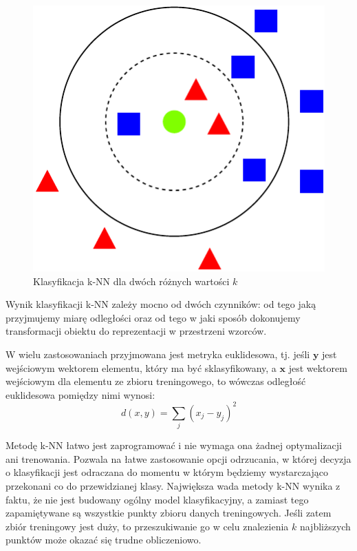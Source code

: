 \begin{figure}[h]
	\centering
	\includegraphics[scale=1.0]{graphics/01_podstawy_teoretyczne/knn-example.pdf}
	\caption{ Klasyfikacja k-NN dla dwóch różnych wartości $k$ \cite{AJANKI07} }
	\label{fig:knn-example}
\end{figure}

Wynik klasyfikacji k-NN zależy mocno od dwóch czynników: od tego jaką przyjmujemy miarę odległości oraz od tego w jaki sposób dokonujemy transformacji obiektu do reprezentacji w przestrzeni wzorców.

W wielu zastosowaniach przyjmowana jest metryka euklidesowa, tj. jeśli $\boldsymbol{y}$ jest wejściowym wektorem elementu, który ma być sklasyfikowany, a $\boldsymbol{x}$ jest wektorem wejściowym dla elementu ze zbioru treningowego, to wówczas odległość euklidesowa pomiędzy nimi wynosi:
\begin{equation} 
\label{knn-euclides} 
d(x, y) = \sum_j (x_j - y_j)^2
\end{equation}

Metodę k-NN łatwo jest zaprogramować i nie wymaga ona żadnej optymalizacji ani trenowania. Pozwala na łatwe zastosowanie opcji odrzucania, w której decyzja o klasyfikacji jest odraczana do momentu w którym będziemy wystarczająco przekonani co do przewidzianej klasy. Największa wada metody k-NN wynika z faktu, że nie jest budowany ogólny model klasyfikacyjny, a zamiast tego zapamiętywane są wszystkie punkty zbioru danych treningowych. Jeśli zatem zbiór treningowy jest duży, to przeszukiwanie go w celu znalezienia $k$ najbliższych punktów może okazać się trudne obliczeniowo.\cite{HAND01}

